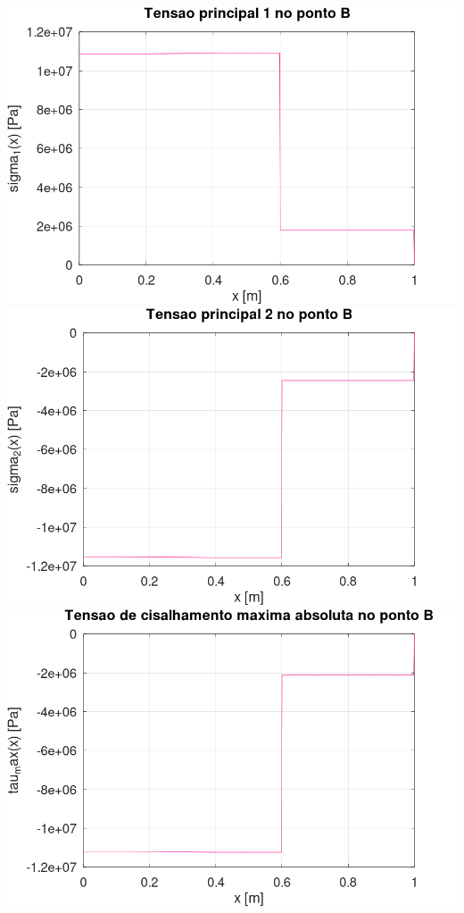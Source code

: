 \documentclass[10pt]{article}
\begin{document}
\begin{center}
    \includegraphics[scale=0.25]{figure21.png}
    \includegraphics[scale=0.25]{figure22.png}
    \includegraphics[scale=0.25]{figure23.png}

\end{center}
\end{document}
